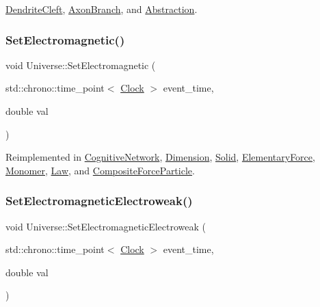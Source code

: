 \mbox{\hyperlink{classDendriteCleft_a428b8e5117f381a382e0071b936d42a1}{Dendrite\+Cleft}}, \mbox{\hyperlink{classAxonBranch_a96ba30b18627563d637d4e02fac943be}{Axon\+Branch}}, and \mbox{\hyperlink{classAbstraction_a82cd32bf3de41f35ab76d80611fe6763}{Abstraction}}.

\mbox{\label{classUniverse_aa981fc7e252b1fbbb675f0371860954d}} 
\subsubsection{\texorpdfstring{Set\+Electromagnetic()}{SetElectromagnetic()}}
{\footnotesize\ttfamily void Universe\+::\+Set\+Electromagnetic (\begin{DoxyParamCaption}\item[{std\+::chrono\+::time\+\_\+point$<$ \mbox{\hyperlink{universe_8h_a0ef8d951d1ca5ab3cfaf7ab4c7a6fd80}{Clock}} $>$}]{event\+\_\+time,  }\item[{double}]{val }\end{DoxyParamCaption})\hspace{0.3cm}{\ttfamily [virtual]}}



Reimplemented in \mbox{\hyperlink{classCognitiveNetwork_a31764cd5746369d16b45f2ff74806a0b}{Cognitive\+Network}}, \mbox{\hyperlink{classDimension_ad8c18ce6358904e01594092dca9f1311}{Dimension}}, \mbox{\hyperlink{classSolid_a9a660f9d94f597712c67922aa1d4d795}{Solid}}, \mbox{\hyperlink{classElementaryForce_a67f6845bd715c29c17387d291b343a1b}{Elementary\+Force}}, \mbox{\hyperlink{classMonomer_a50e41be601b31450a97bfd15950cfb3d}{Monomer}}, \mbox{\hyperlink{classLaw_acabe1a3113c207368f3bb6fe81e13963}{Law}}, and \mbox{\hyperlink{classCompositeForceParticle_a476c0d570c3be75c9e186df1ec2a5cda}{Composite\+Force\+Particle}}.

\mbox{\label{classUniverse_a608aa95698380f791a0ffba45cc1bee3}} 
\subsubsection{\texorpdfstring{Set\+Electromagnetic\+Electroweak()}{SetElectromagneticElectroweak()}}
{\footnotesize\ttfamily void Universe\+::\+Set\+Electromagnetic\+Electroweak (\begin{DoxyParamCaption}\item[{std\+::chrono\+::time\+\_\+point$<$ \mbox{\hyperlink{universe_8h_a0ef8d951d1ca5ab3cfaf7ab4c7a6fd80}{Clock}} $>$}]{event\+\_\+time,  }\item[{double}]{val }\end{DoxyParamCaption})\hspace{0.3cm}{\ttfamily [virtual]}}



